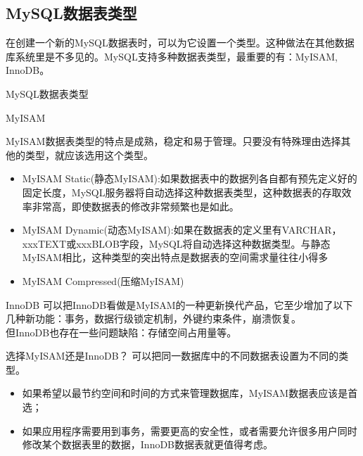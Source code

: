 \documentclass[CJK]{beamer}
\begin{document}
\begin{CJK*}{UTF8}{gbsn}
\subsection{MySQL数据表类型}
\begin{frame}{}
	\begin{block}{}
	在创建一个新的MySQL数据表时，可以为它设置一个类型。这种做法在其他数据库系统里是不多见的。MySQL支持多种数据表类型，最重要的有：MyISAM, InnoDB。
	\end{block}
\end{frame}
\begin{frame}{MySQL数据表类型}
	\begin{block}{MyISAM}
	{\tiny
	MyISAM数据表类型的特点是成熟，稳定和易于管理。只要没有特殊理由选择其他的类型，就应该选用这个类型。
		\begin{itemize}
			\item MyISAM Static(静态MyISAM):如果数据表中的数据列各自都有预先定义好的固定长度，MySQL服务器将自动选择这种数据表类型，这种数据表的存取效率非常高，即使数据表的修改非常频繁也是如此。
			\item MyISAM Dynamic(动态MyISAM):如果在数据表的定义里有VARCHAR，xxxTEXT或xxxBLOB字段，MySQL将自动选择这种数据类型。与静态MyISAM相比，这种类型的突出特点是数据表的空间需求量往往小得多
			\item MyISAM Compressed(压缩MyISAM)
		\end{itemize}
	}
	\end{block}
	\begin{block}{InnoDB}
	{\tiny
		可以把InnoDB看做是MyISAM的一种更新换代产品，它至少增加了以下几种新功能：事务，数据行级锁定机制，外键约束条件，崩溃恢复。\\
		但InnoDB也存在一些问题缺陷：存储空间占用量等。
	}
	\end{block}	
\end{frame}
\begin{frame}{选择MyISAM还是InnoDB？}
	可以把同一数据库中的不同数据表设置为不同的类型。\\
	\begin{itemize}
		\item 如果希望以最节约空间和时间的方式来管理数据库，MyISAM数据表应该是首选；
		\item 如果应用程序需要用到事务，需要更高的安全性，或者需要允许很多用户同时修改某个数据表里的数据，InnoDB数据表就更值得考虑。
	\end{itemize}
\end{frame}

\end{CJK*}
\end{document}
